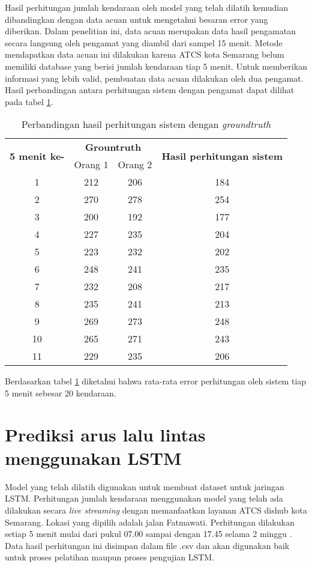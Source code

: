 \documentclass[../thesis.tex]{subfiles}
\begin{document}
Hasil perhitungan jumlah kendaraan oleh model yang telah dilatih kemudian dibandingkan dengan data acuan untuk mengetahui besaran error yang diberikan. Dalam penelitian ini, data acuan merupakan data hasil pengamatan secara langsung oleh pengamat yang diambil dari sampel 15 menit.
Metode mendapatkan data acuan ini dilakukan karena ATCS kota Semarang belum memiliki database yang berisi jumlah kendaraan tiap 5 menit. Untuk memberikan informasi yang lebih valid, pembuatan data acuan dilakukan oleh dua pengamat.
Hasil perbandingan antara perhitungan sistem dengan pengamat dapat dilihat pada tabel \ref{Count_result}. 
\begin{table}[htp]
\centering
\begin{tabular}{|c|c|c|c|}
	\hline 
	\multirow{2}{*}{\textbf{5 menit ke-}} & \multicolumn{2}{c|}{\textbf{Grountruth}} &  \multirow{2}{*}{\textbf{Hasil perhitungan sistem}}\\ \cline{2-3}
	& Orang 1& Orang 2 &\\
	\hline
	1& 212 & 206 & 184\\
	2 & 270 & 278 & 254\\
	3 & 200 & 192 & 177\\
	4 & 227 & 235 & 204 \\
	5 & 223 & 232 & 202 \\
	6 & 248 & 241 & 235 \\
	7 & 232 & 208 & 217 \\
	8 & 235 & 241 & 213 \\
	9 & 269 & 273 & 248 \\
	10 & 265 & 271 & 243 \\
	11 & 229 & 235 & 206 \\
	\hline
\end{tabular}
\caption{Perbandingan hasil perhitungan sistem dengan \textit{groundtruth}}
\label{Count_result}
\end{table} 
Berdasarkan tabel \ref{Count_result} diketahui bahwa rata-rata error perhitungan oleh sistem tiap 5 menit sebesar 20 kendaraan.

\section{Prediksi arus lalu lintas menggunakan LSTM}
Model yang telah dilatih digunakan untuk membuat dataset untuk jaringan LSTM.
Perhitungan jumlah kendaraan menggunakan model yang telah ada dilakukan secara \textit{live streaming} dengan memanfaatkan layanan ATCS dishub kota Semarang. Lokasi yang dipilih adalah jalan Fatmawati. Perhitungan dilakukan setiap 5 menit mulai dari pukul 07.00 sampai dengan 17.45 selama 2 minggu . 
Data hasil perhitungan ini disimpan dalam file .csv dan akan digunakan baik untuk proses pelatihan maupun proses pengujian LSTM.
\end{document}
